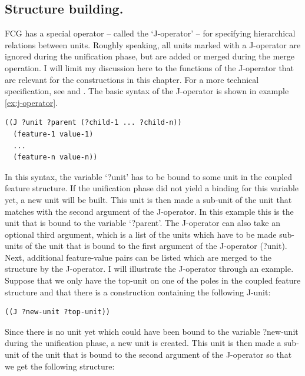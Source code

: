 \subsection{Structure building.} 
FCG has a special operator -- called the `J-operator' -- for specifying hierarchical relations between units. Roughly speaking, all units marked with a J-operator are ignored during the unification phase, but are added or merged during the merge operation. I will limit my discussion here to the functions of the J-operator that are relevant for the constructions in this chapter. For a more technical specification, see \citet[chapter 4]{debeule07compositionality} and \citet{debeule05hierarchy}. The basic syntax of the J-operator is shown in example \ref{ex:j-operator}.

\ea
\label{ex:j-operator}
\ea
\begin{lstlisting}
((J ?unit ?parent (?child-1 ... ?child-n))
  (feature-1 value-1)
  ...
  (feature-n value-n))
\end{lstlisting}
\z
\z

In this syntax, the variable `?unit' has to be bound to some unit in the coupled feature structure. If the unification phase did not yield a binding for this variable yet, a new unit will be built. This unit is then made a sub-unit of the unit that matches with the second argument of the J-operator. In this example this is the unit that is bound to the variable `?parent'. The J-operator can also take an optional third argument, which is a list of the units which have to be made sub-units of the unit that is bound to the first argument of the J-operator (?unit). Next, additional feature-value pairs can be listed which are merged to the structure by the J-operator. I will illustrate the J-operator through an example. Suppose that we only have the top-unit on one of the poles in the coupled feature structure and that there is a construction containing the following J-unit:

\ea
\begin{lstlisting}
((J ?new-unit ?top-unit))
\end{lstlisting}
\z


Since there is no unit yet which could have been bound to the variable ?new-unit during the unification phase, a new unit is created. This unit is then made a sub-unit of the unit that is bound to the second argument of the J-operator so that we get the following structure:

